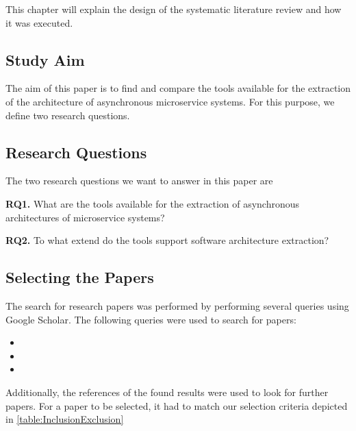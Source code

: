 



This chapter will explain the design of the systematic literature review and how it was executed.

\subsection{Study Aim}
\label{sec:StudyDesign:StudyAim}
The aim of this paper is to find and compare the tools available for the extraction of the architecture of asynchronous microservice systems.
For this purpose, we define two research questions.

\subsection{Research Questions}
\label{sec:StudyDesign:ResearchQuestions}
The two research questions we want to answer in this paper are

\textbf{RQ1.} What are the tools available for the extraction of asynchronous architectures of microservice systems?

\textbf{RQ2.} To what extend do the tools support software architecture extraction?

\subsection{Selecting the Papers}
\label{sec:StudyDesign:SelectingPapers}
The search for research papers was performed by performing several queries using Google Scholar.
The following queries were used to search for papers:
\begin{itemize}
	\item {}
	\item {}
	\item {}
\end{itemize}

Additionally, the references of the found results were used to look for further papers.
For a paper to be selected, it had to match our selection criteria depicted in \autoref{table:InclusionExclusion}


